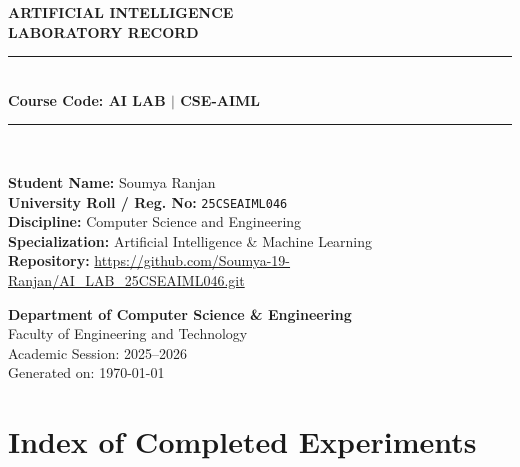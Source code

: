 \documentclass[11pt,a4paper]{report}
\begin{document}
\begin{titlepage}
    \centering
    \vspace*{1.5cm}
    
    {\Huge \bfseries \color{primary} ARTIFICIAL INTELLIGENCE\\[6pt] LABORATORY RECORD}\\[1.5cm]
    
    \rule{\linewidth}{1.5pt}\\[0.4cm]
    {\Large \bfseries Course Code: AI LAB $\vert$ CSE-AIML}\\[0.4cm]
    \rule{\linewidth}{1.5pt}\\[2cm]
    
    \begin{minipage}{0.8\textwidth}
    \centering
    \large
    \textbf{Student Name:} Soumya Ranjan \\[8pt]
    \textbf{University Roll / Reg. No:} \texttt{25CSEAIML046} \\[8pt]
    \textbf{Discipline:} Computer Science and Engineering \\[8pt]
    \textbf{Specialization:} Artificial Intelligence \& Machine Learning \\[8pt]
    \textbf{Repository:} \url{https://github.com/Soumya-19-Ranjan/AI_LAB_25CSEAIML046.git}
    \end{minipage}
    
    \vfill
    
    {\large \bfseries Department of Computer Science \& Engineering}\\[4pt]
    {\large Faculty of Engineering and Technology}\\[6pt]
    {\large Academic Session: 2025--2026}\\[4pt]
    {\small Generated on: \today}
    
\end{titlepage}

\newpage
\chapter*{Index of Completed Experiments}
\end{document}
